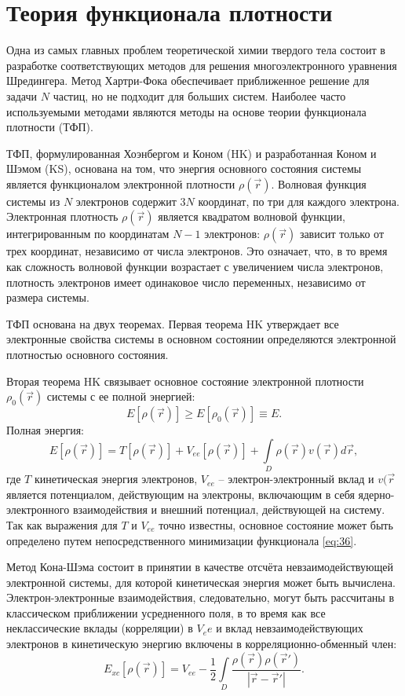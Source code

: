 \chapter{Теория функционала плотности}
Одна из самых главных проблем теоретической химии твердого тела состоит в разработке соответствующих методов для решения многоэлектронного уравнения Шредингера. Метод Хартри-Фока обеспечивает приближенное решение для задачи \(N\) частиц, но не подходит для больших систем. Наиболее часто используемыми методами являются методы на основе теории функционала плотности (ТФП).

ТФП, формулированная Хоэнбергом и Коном (HK) и разработанная Коном и Шэмом (KS), основана на том, что энергия основного состояния системы является функционалом электронной плотности \(\rho(\vec{r})\). Волновая функция системы из \(N\) электронов содержит \(3N\) координат, по три для каждого электрона. Электронная плотность \(\rho(\vec{r})\) является квадратом волновой функции, интегрированным по координатам \(N-1\) электронов: \(\rho(\vec{r})\) зависит только от трех координат, независимо от числа электронов. Это означает, что, в то время как сложность волновой функции возрастает с увеличением числа электронов, плотность электронов имеет одинаковое число переменных, независимо от размера системы.

ТФП основана на двух теоремах. Первая теорема HK утверждает все электронные свойства системы в основном состоянии определяются электронной плотностью основного состояния.

Вторая теорема HK связывает основное состояние электронной плотности \(\rho_0(\vec{r})\) системы с ее полной энергией:
\begin{equation}
    E[\rho(\vec{r})] \ge E[\rho_0(\vec{r})] \equiv E.
\end{equation}
Полная энергия:
\begin{equation}
    E[\rho(\vec{r})] = T[\rho(\vec{r})] + V_{ee}[\rho(\vec{r})]+
    \int\limits_D \rho(\vec{r}) v(\vec{r}) d\vec{r},
    \label{eq:36}
\end{equation}
где \(T\) кинетическая энергия электронов, \(V_{ee}\) -- электрон-электронный вклад и \(v(\vec{r}\) является потенциалом, действующим на электроны, включающим в себя ядерно-электронного взаимодействия и внешний потенциал, действующей на систему. Так как выражения для \( T \) и \(V_{ee}\) точно известны, основное состояние может быть определено путем непосредственного минимизации функционала \eqref{eq:36}.

Метод Кона-Шэма состоит в принятии в качестве отсчёта невзаимодействующей электронной системы, для которой кинетическая энергия может быть вычислена. Электрон-электронные взаимодействия, следовательно, могут быть рассчитаны в классическом приближении усредненного поля, в то время как все неклассические вклады (корреляции) в \(V_ee\) и вклад невзаимодействующих электронов в кинетическую энергию включены в корреляционно-обменный член:
\begin{equation}
    E_{xc}[\rho(\vec{r})] = V_{ee} - \frac{1}{2}\int\limits_{D}\frac{\rho(\vec{r})\rho(\vec{r}')}{|\vec{r} - \vec{r}'|}.
    \label{eq:37}
\end{equation}

